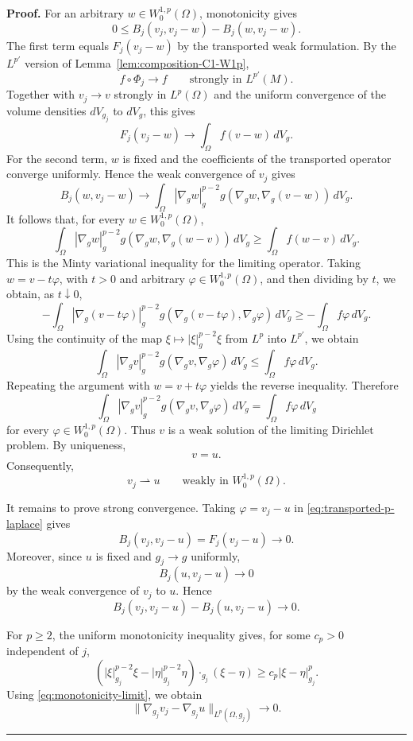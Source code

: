 \documentclass{article}
\newenvironment{proof}[1][Proof]{\textbf{#1.} }{\hfill\rule{0.5em}{0.5em}}
\begin{document}
\begin{proof}
For an arbitrary $w{ \in }W_0^{1,p}(\Omega)$, monotonicity gives
\[
0\leq B_j(v_j,v_j-w)-B_j(w,v_j-w).
\]
The first term equals $F_j(v_j-w)$ by the transported weak formulation.
By the $L^{p'}$ version of Lemma~\ref{lem:composition-C1-W1p},
\[
f\circ\Phi_j\longrightarrow f
\qquad\text{strongly in }L^{p'}(M).
\]
Together with $v_j\to v$ strongly in $L^p(\Omega)$ and the uniform
convergence of the volume densities $dV_{g_j}$ to $dV_g$, this gives
\[
F_j(v_j-w)\longrightarrow \int_\Omega f(v-w)\,dV_g.
\]
For the second term, $w$ is fixed and the coefficients of the transported
operator converge uniformly. Hence the weak convergence of $v_j$ gives
\[
B_j(w,v_j-w)\longrightarrow
\int_\Omega
|\nabla_g w|_g^{p-2}
 g(\nabla_g w,\nabla_g(v-w))\,dV_g.
\]
It follows that, for every $w\in W_0^{1,p}(\Omega)$,
\[
\int_\Omega
|\nabla_g w|_g^{p-2}
 g(\nabla_g w,\nabla_g(w-v))\,dV_g
\geq
\int_\Omega f(w-v)\,dV_g.
\]
This is the Minty variational inequality for the limiting operator. Taking
$w=v-t\varphi$, with $t>0$ and arbitrary $\varphi\in W_0^{1,p}(\Omega)$,
and then dividing by $t$, we obtain, as $t\downarrow0$,
\[
-\int_\Omega
|\nabla_g(v-t\varphi)|_g^{p-2}
 g(\nabla_g(v-t\varphi),\nabla_g\varphi)\,dV_g
\geq
-\int_\Omega f\varphi\,dV_g.
\]
Using the continuity of the map
$\xi\mapsto|\xi|_g^{p-2}\xi$ from $L^p$ into $L^{p'}$, we obtain
\[
\int_\Omega
|\nabla_g v|_g^{p-2}
 g(\nabla_g v,\nabla_g\varphi)\,dV_g
\leq
\int_\Omega f\varphi\,dV_g.
\]
Repeating the argument with $w=v+t\varphi$ yields the reverse inequality.
Therefore
\[
\int_\Omega
|\nabla_g v|_g^{p-2}
 g(\nabla_g v,\nabla_g\varphi)\,dV_g
=
\int_\Omega f\varphi\,dV_g
\]
for every $\varphi\in W_0^{1,p}(\Omega)$. Thus $v$ is a weak solution of
the limiting Dirichlet problem. By uniqueness,
\[
v=u.
\]
Consequently,
\[
v_j\rightharpoonup u
\qquad\text{weakly in }W_0^{1,p}(\Omega).
\]

It remains to prove strong convergence. Taking $\varphi=v_j-u$ in
\eqref{eq:transported-p-laplace} gives
\[
B_j(v_j,v_j-u)=F_j(v_j-u)\longrightarrow0.
\]
Moreover, since $u$ is fixed and $g_j\to g$ uniformly,
\[
B_j(u,v_j-u)\longrightarrow0
\]
by the weak convergence of $v_j$ to $u$. Hence
\begin{equation}
B_j(v_j,v_j-u)-B_j(u,v_j-u)\longrightarrow0.
\label{eq:monotonicity-limit}
\end{equation}

For $p\ge2$, the uniform monotonicity inequality gives, for some
$c_p>0$ independent of $j$,
\[
\left(
|\xi|_{g_j}^{p-2}\xi-|\eta|_{g_j}^{p-2}\eta
\right)\cdot_{g_j}(\xi-\eta)
\ge c_p|\xi-\eta|_{g_j}^p.
\]
Using \eqref{eq:monotonicity-limit}, we obtain
\[
\|\nabla_{g_j}v_j-\nabla_{g_j}u\|_{L^p(\Omega,g_j)}\longrightarrow0.
\]


\end{proof}
\end{document}
